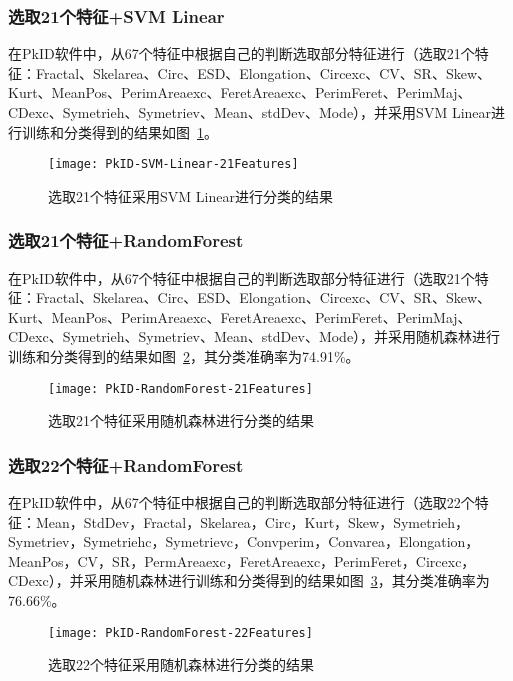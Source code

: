 \subsubsection{选取21个特征+SVM Linear}
在PkID软件中，从67个特征中根据自己的判断选取部分特征进行（选取21个特征：Fractal、Skelarea、Circ、ESD、Elongation、Circexc、CV、SR、Skew、Kurt、MeanPos、PerimAreaexc、FeretAreaexc、PerimFeret、PerimMaj、CDexc、Symetrieh、Symetriev、Mean、stdDev、Mode），并采用SVM Linear进行训练和分类得到的结果如图~\ref{fig:PkID-SVM-Linear-21Features}。

\begin{figure}[!ht]
\centering
\texttt{[image: PkID-SVM-Linear-21Features]}
\caption{选取21个特征采用SVM Linear进行分类的结果}
\label{fig:PkID-SVM-Linear-21Features}
\end{figure}

\subsubsection{选取21个特征+RandomForest}
在PkID软件中，从67个特征中根据自己的判断选取部分特征进行（选取21个特征：Fractal、Skelarea、Circ、ESD、Elongation、Circexc、CV、SR、Skew、Kurt、MeanPos、PerimAreaexc、FeretAreaexc、PerimFeret、PerimMaj、CDexc、Symetrieh、Symetriev、Mean、stdDev、Mode），并采用随机森林进行训练和分类得到的结果如图~\ref{fig:PkID-RandomForest-21Features}，其分类准确率为74.91\%。

\begin{figure}[!ht]
\centering
\texttt{[image: PkID-RandomForest-21Features]}
\caption{选取21个特征采用随机森林进行分类的结果}
\label{fig:PkID-RandomForest-21Features}
\end{figure}

\subsubsection{选取22个特征+RandomForest}
在PkID软件中，从67个特征中根据自己的判断选取部分特征进行（选取22个特征：Mean，StdDev，Fractal，Skelarea，Circ，Kurt，Skew，Symetrieh，Symetriev，Symetriehc，Symetrievc，Convperim，Convarea，Elongation，MeanPos，CV，SR，PermAreaexc，FeretAreaexc，PerimFeret，Circexc，CDexc），并采用随机森林进行训练和分类得到的结果如图~\ref{fig:PkID-RandomForest-22Features}，其分类准确率为76.66\%。

\begin{figure}[!ht]
\centering
\texttt{[image: PkID-RandomForest-22Features]}
\caption{选取22个特征采用随机森林进行分类的结果}
\label{fig:PkID-RandomForest-22Features}
\end{figure}

